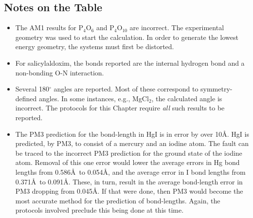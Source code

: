 \subsection*{Notes on the Table}
\begin{itemize}
\item The AM1 results for P$_4$O$_6$ and P$_4$O$_{10}$ are incorrect. The
experimental geometry was used to start the calculation.  In order to generate
the lowest energy geometry, the systems must first be distorted.
\item For salicylaldoxim, the bonds reported are the internal hydrogen bond and
a non-bonding O-N interaction.
\item Several 180$^{\circ}$ angles are reported. Most of these correspond to
symmetry-defined angles.  In some instances, e.g., MgCl$_2$, the calculated
angle is incorrect.  The protocols for this Chapter require {\em all} such
results to be reported.
\item The PM3 prediction for the bond-length in HgI is in error by over 10\AA .
HgI is predicted, by PM3, to consist of a mercury and an iodine atom.  The
fault can be traced to the incorrect PM3 prediction for the ground state of the
iodine atom. Removal of this one error would lower the average errors in Hg
bond lengths from 0.586\AA\ to 0.054\AA , and the average error in I bond
lengths from 0.371\AA\ to 0.091\AA .  These, in turn, result in the average
bond-length error in PM3 dropping from 0.045\AA .  If that were done, then PM3
would become the most accurate method for the prediction of bond-lengths. 
Again, the protocols involved preclude this being done at this time.
\end{itemize}


